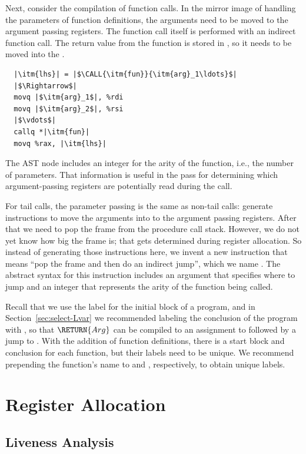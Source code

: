 \documentclass[7x10]{TimesAPriori_MIT}%
\begin{document}
Next, consider the compilation of function calls. In the mirror image
of handling the parameters of function definitions, the arguments need
to be moved to the argument passing registers.  The function call
itself is performed with an indirect function call. The return value
from the function is stored in , so it needs to be moved
into the .
\begin{lstlisting}
  |\itm{lhs}| = |$\CALL{\itm{fun}}{\itm{arg}_1\ldots}$|
  |$\Rightarrow$|
  movq |$\itm{arg}_1$|, %rdi
  movq |$\itm{arg}_2$|, %rsi
  |$\vdots$|
  callq *|\itm{fun}|
  movq %rax, |\itm{lhs}|
\end{lstlisting}
The  AST node includes an integer for the arity of
the function, i.e., the number of parameters. That information is
useful in the  pass for determining which
argument-passing registers are potentially read during the call.

For tail calls, the parameter passing is the same as non-tail calls:
generate instructions to move the arguments into to the argument
passing registers.  After that we need to pop the frame from the
procedure call stack.  However, we do not yet know how big the frame
is; that gets determined during register allocation. So instead of
generating those instructions here, we invent a new instruction that
means ``pop the frame and then do an indirect jump'', which we name
. The abstract syntax for this instruction includes an
argument that specifies where to jump and an integer that represents
the arity of the function being called.

Recall that we use the label  for the initial block of a
program, and in Section~\ref{sec:select-Lvar} we recommended labeling
the conclusion of the program with , so that
$\RETURN{Arg}$ can be compiled to an assignment to  followed
by a jump to . With the addition of function
definitions, there is a start block and conclusion for each function,
but their labels need to be unique. We recommend prepending the
function's name to  and , respectively,
to obtain unique labels.


\section{Register Allocation}
\label{sec:register-allocation-r4}


\subsection{Liveness Analysis}
\label{sec:liveness-analysis-r4}
\end{document}
